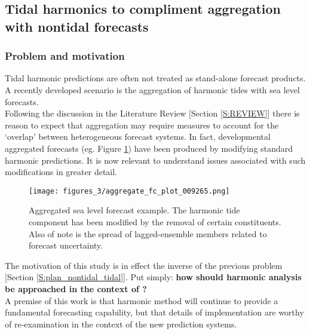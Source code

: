 \newpage
\subsection{Tidal harmonics to compliment aggregation with nontidal forecasts}
\label{S:plan_insitu_analysis}

\subsubsection{Problem and motivation}
Tidal harmonic predictions are often not treated as stand-alone forecast products. 
A recently developed scenario is the aggregation of harmonic tides with \BL{} sea level forecasts.\\

Following the discussion in the Literature Review [Section \ref{S:REVIEW}] there is reason to expect that aggregation may require measures to account for the `overlap' between heterogeneous forecast systems.   In fact, developmental aggregated forecasts (eg. Figure \ref{fig:aggregated_fc}) have been produced by modifying standard harmonic predictions.   It is now relevant to understand issues associated with such modifications in greater detail.\\



\begin{figure}[h]
\begin{center}
\texttt{[image: figures\_3/aggregate\_fc\_plot\_009265.png]}
\caption{Aggregated sea level forecast example.   The harmonic tide component has been modified by the removal of certain constituents. Also of note is the spread of lagged-ensemble members related to forecast uncertainty.}
\label{fig:aggregated_fc}
\end{center}
\end{figure}


The motivation of this study is in effect the inverse of the previous problem [Section \ref{S:plan_nontidal_tidal}].  Put simply: {\bf how should harmonic analysis be approached in the context of \BL{}?}  \\
A premise of this work is that harmonic method will continue to provide a fundamental forecasting capability, but that details of implementation are worthy of re-examination in the context of the new prediction systems.\\




